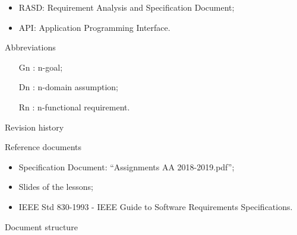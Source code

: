 \documentclass{article}
\begin{document}
\begin{legal}
\begin{legal}
\begin{legal}
{\begin{itemize}
				\item RASD: Requirement Analysis and Specification Document;\\
				\item API: Application Programming Interface.\\
				\end{itemize}
			}
			\item Abbreviations\\
			{\normalfont	
				\begin{itemize}
				\item [Gn]: n-goal;\\
				\item [Dn]: n-domain assumption;\\
				\item [Rn]: n-functional requirement.\\
				\end{itemize}
			}
			\end{legal}
		\item Revision history\\
		\item Reference documents\\
		{\normalfont	
			\begin{itemize}
			\item Specification Document: “Assignments AA 2018-2019.pdf”;\\
			\item Slides of the lessons;\\
			\item IEEE Std 830-1993 - IEEE Guide to Software Requirements Specifications.\\
			\end{itemize}
		}
		\item Document structure\\
		\end{legal}


\end{legal}
\end{document}
